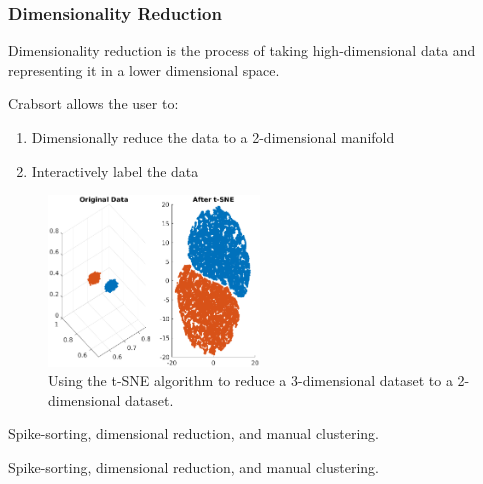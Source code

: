 \documentclass{beamer}
\begin{document}

\begin{frame}
  \frametitle{Dimensionality Reduction}

  Dimensionality reduction is the process of taking high-dimensional data
  and representing it in a lower dimensional space.

  Crabsort allows the user to:

  \begin{enumerate}
    \item Dimensionally reduce the data to a 2-dimensional manifold
    \item Interactively label the data
  \end{enumerate}

  \begin{figure}
    \includegraphics[width=0.5\textwidth]{gfx/t-SNE-example.eps}
    \centering
    \caption{Using the t-SNE algorithm to reduce a 3-dimensional dataset to a 2-dimensional dataset.}
    \label{fig:dimredexample}
  \end{figure}

\end{frame}


\begin{frame}

  \begin{center}
    \caption{Spike-sorting, dimensional reduction, and manual clustering.}
  \end{center}

\end{frame}

\begin{frame}

  \begin{center}
    \caption{Spike-sorting, dimensional reduction, and manual clustering.}
  \end{center}

\end{frame}
\end{document}
